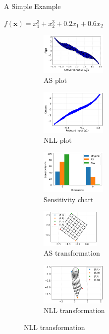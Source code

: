 \documentclass[10pt]{beamer}
\begin{document}
\begin{frame}{A Simple Example}
\begin{center}
    $f(\bm{x}) = x_1^3+x_2^3+0.2x_1+0.6x_2$
\end{center}
\begin{figure}
\begin{subfigure}{0.3\textwidth}
    \includegraphics[width=1.25in]{images/f3 AS.png}
    \caption{AS plot}
\end{subfigure}
\begin{subfigure}{0.3\textwidth}
    \includegraphics[width=1.25in]{images/f3nll.png}
    \caption{NLL plot}
\end{subfigure}
\begin{subfigure}{0.3\textwidth}
    \includegraphics[width=1.25in]{images/f3 sens.png}
    \caption{Sensitivity chart}
\end{subfigure}
\begin{subfigure}{0.3\textwidth}
    \includegraphics[width=1.125in]{images/f3 AS mesh.png}
    \caption{AS transformation}
\end{subfigure}
\begin{subfigure}{0.3\textwidth}
    \includegraphics[width=1.25in]{images/f3nllmesh.png}
    \caption{NLL transformation}
\end{subfigure}
\end{figure}
\end{frame}
\end{document}
